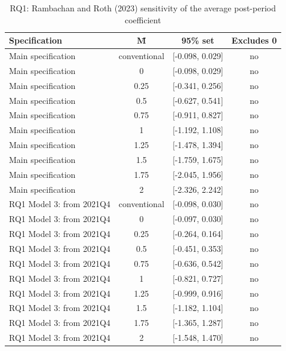\begin{table}[htbp]\centering
\caption{RQ1: Rambachan and Roth (2023) sensitivity of the average post-period coefficient}
\begin{tabular}{lccc}
\toprule
Specification & M̄ & 95\% set & Excludes 0 \\
\midrule
Main specification & conventional & [-0.098, 0.029] & no \\
Main specification & 0 & [-0.098, 0.029] & no \\
Main specification & 0.25 & [-0.341, 0.256] & no \\
Main specification & 0.5 & [-0.627, 0.541] & no \\
Main specification & 0.75 & [-0.911, 0.827] & no \\
Main specification & 1 & [-1.192, 1.108] & no \\
Main specification & 1.25 & [-1.478, 1.394] & no \\
Main specification & 1.5 & [-1.759, 1.675] & no \\
Main specification & 1.75 & [-2.045, 1.956] & no \\
Main specification & 2 & [-2.326, 2.242] & no \\
RQ1 Model 3: from 2021Q4 & conventional & [-0.098, 0.030] & no \\
RQ1 Model 3: from 2021Q4 & 0 & [-0.097, 0.030] & no \\
RQ1 Model 3: from 2021Q4 & 0.25 & [-0.264, 0.164] & no \\
RQ1 Model 3: from 2021Q4 & 0.5 & [-0.451, 0.353] & no \\
RQ1 Model 3: from 2021Q4 & 0.75 & [-0.636, 0.542] & no \\
RQ1 Model 3: from 2021Q4 & 1 & [-0.821, 0.727] & no \\
RQ1 Model 3: from 2021Q4 & 1.25 & [-0.999, 0.916] & no \\
RQ1 Model 3: from 2021Q4 & 1.5 & [-1.182, 1.104] & no \\
RQ1 Model 3: from 2021Q4 & 1.75 & [-1.365, 1.287] & no \\
RQ1 Model 3: from 2021Q4 & 2 & [-1.548, 1.470] & no \\
\bottomrule
\end{tabular}
\par\vspace{2pt}{\footnotesize Relative-magnitudes restriction: each change in the parallel-trends violation between consecutive post-period quarters is at most M̄ times the largest such change between consecutive pre-period quarters (including the change into the reference quarter). Robust sets from the HonestDiD R package (step 08); the breakdown M̄ is the largest M̄ at which zero is excluded.}
\end{table}

